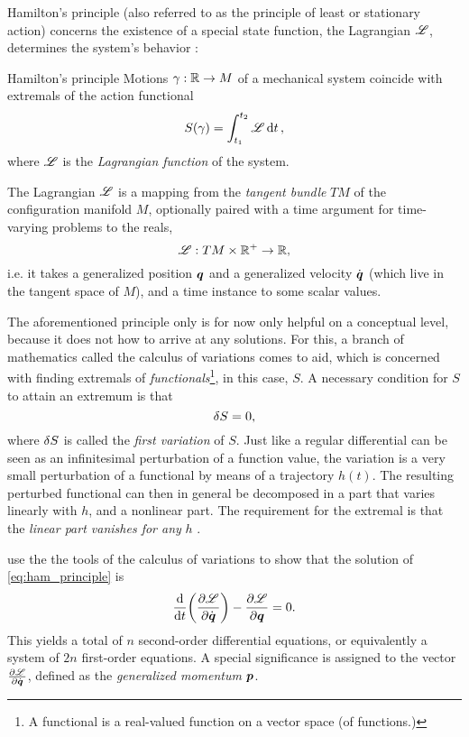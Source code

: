 Hamilton's principle (also referred to as the principle of least or stationary action) concerns the existence of a special state function, the Lagrangian $\mathscr{L}$, determines the system's behavior \cite{Arnold1989}:
\begin{thmblock}{Hamilton's principle}
    Motions $\gamma: \mathbb{R} \to M$ of a mechanical system coincide with extremals of the action functional
    \begin{equation}
        S(\gamma) = \int_{t_1}^{t_2} \mathscr{L} \dd{t},
        \label{eq:ham_principle}
    \end{equation}
    where $\mathscr{L}$ is the \emph{Lagrangian function} of the system.
\end{thmblock}
The Lagrangian \(\mathscr{L}\) is a mapping from the \emph{tangent bundle} \(TM\) of the configuration manifold \(M\), optionally paired with a time argument for time-varying problems to the reals,
    \[ \mathscr{L} : TM \times \mathbb{R}^+ \to \mathbb{R}, \]
i.e. it takes a generalized position \(\vb*{q}\) and a generalized velocity \(\dot{\vb*{q}}\) (which live in the tangent space of \(M\)), and a time instance to some scalar values.

The aforementioned principle only is for now only helpful on a conceptual level, because it does not how to arrive at any solutions. For this, a branch of mathematics called the calculus of variations comes to aid, which is concerned with finding extremals of \emph{functionals}\footnote{A functional is a real-valued function on a vector space (of functions.)}, in this case, \(S\). A necessary condition for \(S\) to attain an extremum is that 
\[ \var{S} = 0,\]
where \(\var{S}\) is called the \emph{first variation} of \(S\). Just like a regular differential can be seen as an infinitesimal perturbation of a function value, the variation is a very small perturbation of a functional by means of a trajectory \(h(t)\). The resulting perturbed functional can then in general be decomposed in a part that varies linearly with \(h\), and a nonlinear part. The requirement for the extremal is that the \emph{linear part vanishes for any} \(h\) \cite{Arnold1989}.

\citet{Landau1960} use the the tools of the calculus of variations to show that the solution of \cref{eq:ham_principle} is
\[ \dv{}{t}\qty(\pdv{\ensuremath{\mathscr{L}}}{\ensuremath{\dot{\vb*{q}}}}) - \pdv{\ensuremath{\mathscr{L}}}{\ensuremath{\vb*{q}}} = 0. \]
This yields a total of \(n\) second-order differential equations, or equivalently a system of \(2n\) first-order equations. A special significance is assigned to the vector $\pdv{\ensuremath{\mathscr{L}}}{\ensuremath{\dot{\vb*{q}}}}$, defined as the \emph{generalized momentum} $\vb*{p}$.

